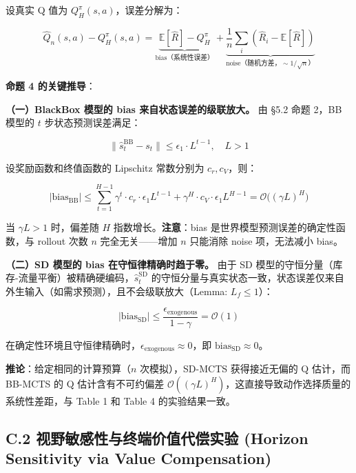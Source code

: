 \documentclass[UTF8]{ctexart}
\begin{document}
设真实 Q 值为 \(Q^\pi_H(s,a)\)，误差分解为：

\[\hat{Q}_n(s,a) - Q^\pi_H(s,a) = \underbrace{\mathbb{E}[\hat{R}] - Q^\pi_H}_{\text{bias（系统性误差）}} + \underbrace{\frac{1}{n}\sum_i (\hat{R}_i - \mathbb{E}[\hat{R}])}_{\text{noise（随机方差，}\sim 1/\sqrt{n}\text{）}}\]

\textbf{命题 4 的关键推导}：

\textbf{（一）BlackBox 模型的 bias 来自状态误差的级联放大。} 由 §5.2
命题 2，BB 模型的 \(t\) 步状态预测误差满足：

\[\|\hat{s}_t^{\text{BB}} - s_t\| \leq \epsilon_1 \cdot L^{t-1}, \quad L > 1\]

设奖励函数和终值函数的 Lipschitz 常数分别为 \(c_r, c_V\)，则：

\[|\text{bias}_{\text{BB}}| \leq \sum_{t=1}^{H-1} \gamma^t \cdot c_r \cdot \epsilon_1 L^{t-1} + \gamma^H \cdot c_V \cdot \epsilon_1 L^{H-1} = \mathcal{O}\bigl((\gamma L)^H\bigr)\]

当 \(\gamma L > 1\) 时，偏差随 \(H\) 指数增长。\textbf{注意}：bias
是世界模型预测误差的确定性函数，与 rollout 次数 \(n\) 完全无关------增加
\(n\) 只能消除 noise 项，无法减小 bias。

\textbf{（二）SD 模型的 bias 在守恒律精确时趋于零。} 由于 SD
模型的守恒分量（库存-流量平衡）被精确硬编码，\(\hat{s}_t^{\text{SD}}\)
的守恒分量与真实状态一致，状态误差仅来自外生输入（如需求预测），且不会级联放大（Lemma:
\(L_f \leq 1\)）：

\[|\text{bias}_{\text{SD}}| \leq \frac{\epsilon_{\text{exogenous}}}{1 - \gamma} = \mathcal{O}(1)\]

在确定性环境且守恒律精确时，\(\epsilon_{\text{exogenous}} \approx 0\)，即
\(\text{bias}_{\text{SD}} \approx 0\)。

\textbf{推论}：给定相同的计算预算（\(n\) 次模拟），SD-MCTS
获得接近无偏的 Q 估计，而 BB-MCTS 的 Q 估计含有不可约偏差
\(\mathcal{O}((\gamma L)^H)\)，这直接导致动作选择质量的系统性差距，与
Table 1 和 Table 4 的实验结果一致。

\hypertarget{c.2-horizon-sensitivity-ux89c6ux91ceux654fux611fux6027ux4e0eux7ec8ux7aefux4ef7ux503cux4ee3ux507fux5b9eux9a8c}{%
\subsection{C.2 视野敏感性与终端价值代偿实验 (Horizon Sensitivity via Value Compensation)}\label{c.2-horizon-sensitivity-ux89c6ux91ceux654fux611fux6027ux4e0eux7ec8ux7aefux4ef7ux503cux4ee3ux507fux5b9eux9a8c}}
\end{document}

